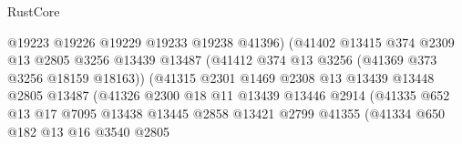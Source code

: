 \begin{lexlean}{RustCore}
\begin{coremodule}
                                          @19223
                                          @19226
                                          @19229
                                          @19233
                                          @19238
                                          @41396)
                                        (@41402
                                          @13415
                                          @374
                                          @2309
                                          @13
                                          @2805
                                          @3256
                                          @13439
                                          @13487
                                          (@41412 @374 @13 @3256 (@41369 @373 @3256 @18159 @18163))
                                          (@41315
                                            @2301
                                            @1469
                                            @2308
                                            @13
                                            @13439
                                            @13448
                                            @2805
                                            @13487
                                            (@41326
                                              @2300
                                              @18
                                              @11
                                              @13439
                                              @13446
                                              @2914
                                              (@41335
                                                @652
                                                @13
                                                @17
                                                @7095
                                                @13438
                                                @13445
                                                @2858
                                                @13421
                                                @2799
                                                @41355
                                                (@41334
                                                  @650
                                                  @182
                                                  @13
                                                  @16
                                                  @3540
                                                  @2805

\end{coremodule}
\end{lexlean}
